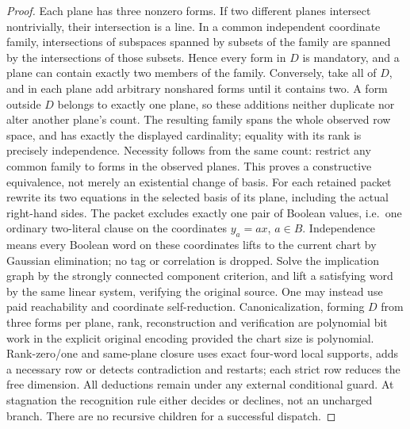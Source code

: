 \documentclass[11pt]{article}
\begin{document}
\begin{proof}
Each plane has three nonzero forms. If two different planes intersect nontrivially, their intersection is a line. In a common independent coordinate family, intersections of subspaces spanned by subsets of the family are spanned by the intersections of those subsets. Hence every form in $D$ is mandatory, and a plane can contain exactly two members of the family. Conversely, take all of $D$, and in each plane add arbitrary nonshared forms until it contains two. A form outside $D$ belongs to exactly one plane, so these additions neither duplicate nor alter another plane's count. The resulting family spans the whole observed row space, and has exactly the displayed cardinality; equality with its rank is precisely independence. Necessity follows from the same count: restrict any common family to forms in the observed planes. This proves a constructive equivalence, not merely an existential change of basis.
For each retained packet rewrite its two equations in the selected basis of its plane, including the actual right-hand sides. The packet excludes exactly one pair of Boolean values, i.e.\ one ordinary two-literal clause on the coordinates $y_a=a x$, $a\in B$. Independence means every Boolean word on these coordinates lifts to the current chart by Gaussian elimination; no tag or correlation is dropped. Solve the implication graph by the strongly connected component criterion, and lift a satisfying word by the same linear system, verifying the original source. One may instead use paid reachability and coordinate self-reduction. Canonicalization, forming $D$ from three forms per plane, rank, reconstruction and verification are polynomial bit work in the explicit original encoding provided the chart size is polynomial. Rank-zero/one and same-plane closure uses exact four-word local supports, adds a necessary row or detects contradiction and restarts; each strict row reduces the free dimension. All deductions remain under any external conditional guard. At stagnation the recognition rule either decides or declines, not an uncharged branch. There are no recursive children for a successful dispatch.
\end{proof}
\end{document}
